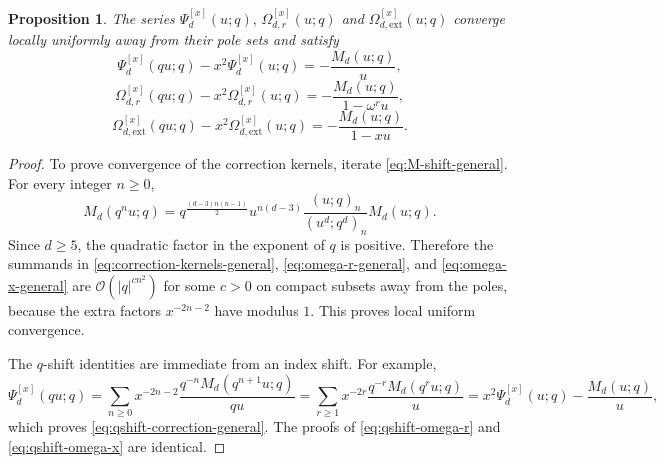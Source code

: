 \documentclass[12pt]{amsart}
\numberwithin{equation}{section}
\newtheorem{proposition}[theorem]{Proposition}
\newcommand{\OO}{\mathcal O}
\begin{document}
\begin{proposition}
    The series $\Psi_d^{[x]}(u;q),\, \Omega_{d,r}^{[x]}(u;q) $ and $\Omega_{d,\mathrm{ext}}^{[x]}(u;q)$ converge locally uniformly away from their pole sets and satisfy
\begin{equation}\label{eq:qshift-correction-general}
\Psi_d^{[x]}(qu;q)-x^2\Psi_d^{[x]}(u;q)=-\frac{M_d(u;q)}{u},
\end{equation}
\begin{equation}\label{eq:qshift-omega-r}
\Omega_{d,r}^{[x]}(qu;q)-x^2\Omega_{d,r}^{[x]}(u;q)=-\frac{M_d(u;q)}{1-\omega^r u},
\end{equation}
\begin{equation}\label{eq:qshift-omega-x}
\Omega_{d,\mathrm{ext}}^{[x]}(qu;q)-x^2\Omega_{d,\mathrm{ext}}^{[x]}(u;q)=-\frac{M_d(u;q)}{1-xu}.
\end{equation}
\end{proposition}

\begin{proof}
    To prove convergence of the correction kernels, iterate \eqref{eq:M-shift-general}.  For every integer $n\geq 0$,
\begin{equation}\label{eq:M-iterate-general}
M_d(q^nu;q)
=
q^{\frac{(d-3)n(n-1)}2}u^{n(d-3)}\frac{(u;q)_n}{(u^d;q^d)_n}M_d(u;q).
\end{equation}
Since $d\geq 5$, the quadratic factor in the exponent of $q$ is positive.  Therefore the summands in \eqref{eq:correction-kernels-general}, \eqref{eq:omega-r-general}, and \eqref{eq:omega-x-general} are $\OO(|q|^{cn^2})$ for some $c>0$ on compact subsets away from the poles, because the extra factors $x^{-2n-2}$ have modulus $1$.  This proves local uniform convergence.

The $q$-shift identities are immediate from an index shift.  For example,
\[
\Psi_d^{[x]}(qu;q)
=
\sum_{n\geq 0}x^{-2n-2}\frac{q^{-n}M_d(q^{n+1}u;q)}{qu}
=
\sum_{r\geq 1}x^{-2r}\frac{q^{-r}M_d(q^ru;q)}{u}
=
x^2\Psi_d^{[x]}(u;q)-\frac{M_d(u;q)}{u},
\]
which proves \eqref{eq:qshift-correction-general}.  The proofs of \eqref{eq:qshift-omega-r} and \eqref{eq:qshift-omega-x} are identical.
\end{proof}
\end{document}
